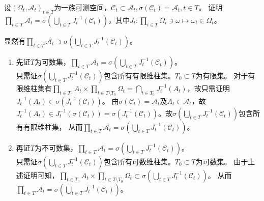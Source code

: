 \documentclass{ctexart}
\begin{document}
\begin{problem}\label{pro:4.10}
  设\((\Omega_t,\mathcal{A}_t)_{t \in T} \)为一族可测空间，\(\mathcal{C}_t \subset \mathcal{A}_t,\sigma(\mathcal{C}_t) = \mathcal{A}_t,t \in T \)。
  证明\(\prod_{t \in T}\mathcal{A}_t = \sigma\left(\bigcup_{t \in T} J_t^{-1}(\mathcal{C}_t)\right) \)，其中\(J_t:\prod_{i \in T} \Omega_i\ni \omega \mapsto \omega_t \in \Omega_t \)。
\end{problem}
\begin{solution}
  显然有\(\prod_{t \in T}\mathcal{A}_t \supset \sigma\left(\bigcup_{t \in T} J_t^{-1}(\mathcal{C}_t)\right) \)。
  \begin{enumerate}
    \item 先证\(T \)为可数集，\(\prod_{t \in T}\mathcal{A}_t = \sigma\left(\bigcup_{t \in T} J_t^{-1}(\mathcal{C}_t)\right) \)。\\
      只需证\( \sigma\left(\bigcup_{t \in T} J_t^{-1}(\mathcal{C}_t)\right) \)包含所有有限维柱集。\(T_0 \subset T \)为有限集。
      对于有限维柱集有\(\prod_{t \in T_{0}}A_t \times \prod_{t \in T \setminus T_{0}} \Omega_t= \bigcap_{t \in T_{0}} J_t^{-1}(A_t)\)，故只需证明\(J_t^{-1}(A_t) \in \sigma(J_t^{-1}(\mathcal{C}_t))\)。
      由\(\sigma(\mathcal{C}_t) = \mathcal{A}_t \)及\(A_t \in \mathcal{A}_t \)，故\(J_t^{-1}(A_t) \in J_t^{-1}(\sigma(\mathcal{C}_t))=\sigma(J_t^{-1}(\mathcal{C}_t))  \)。故\( \sigma\left(\bigcup_{t \in T} J_t^{-1}(\mathcal{C}_t)\right) \)包含所有有限维柱集，
      从而\(\prod_{t \in T}\mathcal{A}_t = \sigma\left(\bigcup_{t \in T} J_t^{-1}(\mathcal{C}_t)\right) \)。
    \item 再证\(T \)为不可数集，\(\prod_{t \in T}\mathcal{A}_t = \sigma\left(\bigcup_{t \in T} J_t^{-1}(\mathcal{C}_t)\right) \)。\\
      只需证\( \sigma\left(\bigcup_{t \in T} J_t^{-1}(\mathcal{C}_t)\right) \)包含所有可数维柱集。\(T_0 \subset T \)为可数集。
      由于上述证明可知，\(\prod_{t \in T_0}A_t \times \prod_{t \in T \setminus T_{0}} \Omega_t \subset \sigma(\bigcup_{t \in T} J_t^{-1} (\mathcal{C}_t))\)。
      从而\(\prod_{t \in T}\mathcal{A}_t = \sigma\left(\bigcup_{t \in T} J_t^{-1}(\mathcal{C}_t)\right) \)。
  \end{enumerate}
\end{solution}
\end{document}
